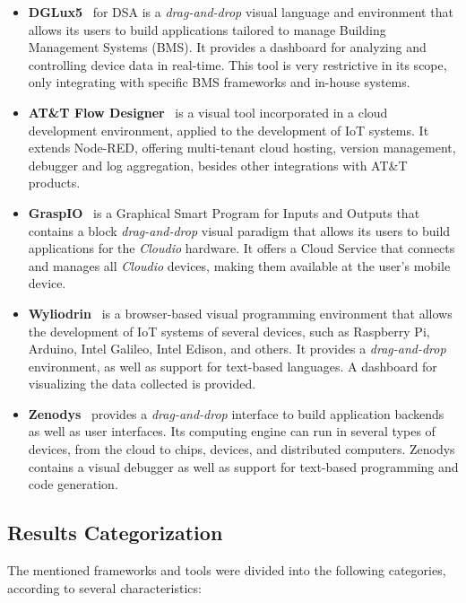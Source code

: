\begin{itemize}
\item\textbf{DGLux5}~\cite{dglux5} for DSA is a \textit{drag-and-drop} visual language and environment that allows its users to build applications tailored to manage Building Management Systems (BMS). It provides a dashboard for analyzing and controlling device data in real-time. This tool is very restrictive in its scope, only integrating with specific BMS frameworks and in-house systems.

\item\textbf{AT\&T Flow Designer}~\cite{attflowdesigner} is a visual tool incorporated in a cloud development environment, applied to the development of IoT systems. It extends Node-RED, offering multi-tenant cloud hosting, version management, debugger and log aggregation, besides other integrations with AT\&T products.

\item\textbf{GraspIO}~\cite{graspio} is a Graphical Smart Program for Inputs and Outputs that contains a block \textit{drag-and-drop} visual paradigm that allows its users to build applications for the \textit{Cloudio} hardware. It offers a Cloud Service that connects and manages all \textit{Cloudio} devices, making them available at the user's mobile device.

\item\textbf{Wyliodrin}~\cite{wyliodrin} is a browser-based visual programming environment that allows the development of IoT systems of several devices, such as Raspberry Pi, Arduino, Intel Galileo, Intel Edison, and others. It provides a \textit{drag-and-drop} environment, as well as support for text-based languages. A dashboard for visualizing the data collected is provided.

\item\textbf{Zenodys}~\cite{zenodys} provides a \textit{drag-and-drop} interface to build application backends as well as user interfaces. Its computing engine can run in several types of devices, from the cloud to chips, devices, and distributed computers. Zenodys contains a visual debugger as well as support for text-based programming and code generation. 
\end{itemize}

\subsection{Results Categorization}\label{sec:slr_results_categorization}

The mentioned frameworks and tools were divided into the following categories, according to several characteristics:

